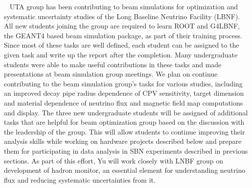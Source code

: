 %
%
~\label{sec:dune-beam-sim}
UTA group has been contributing to beam simulations for optimization and systematic uncertainty studies of the Long Baseline Neutrino Facility (LBNF). All new students joining the group are required to learn ROOT and G4LBNF, the GEANT4 based beam simulation package, as part of their training process.  Since most of these tasks are well defined, each student can be assigned to the given task and write up the report after the completion. Many undergraduate students were able to make useful contributions in these tasks and made presentations at beam simulation group meetings.  We plan on continue contributing to the beam simulation group's tasks for various studies, including an improved decay pipe radius dependence of CPV sensitivity, target dimension and material dependence of neutrino flux and magnetic field map computations and display. The three new undergraduate students will be assigned of additional tasks that are helpful for beam optimization group based on the discussion with the leadership of the group.  This will allow students to continue improving their analysis skills while working on hardware projects described below and prepare them for participating in data analysis in SBN experiments described in previous sections.  As part of this effort, Yu will work closely with LNBF group on development of hadron monitor, an essential element for understanding neutrino flux and reducing systematic uncertainties from it.
